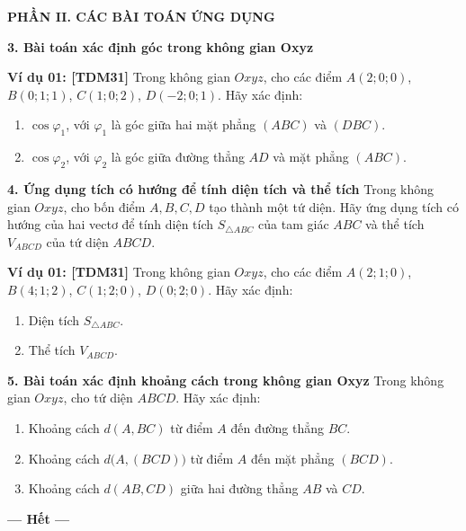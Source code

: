 \documentclass[12pt,a4paper]{article}
\newcommand{\partheading}[1]{\par\vspace{4pt}\noindent\textbf{\textcolor{sectionpurple}{#1}}\par\vspace{1pt}}
\newcommand{\example}[2][TDM22]{\par\vspace{1pt}\noindent\textbf{\textcolor{sectionpurple}{Ví dụ #2:} \textcolor{noteborder}{[#1]}}\enspace}
\newcommand{\tightitem}{\setlength{\itemsep}{0pt}\setlength{\topsep}{1pt}\setlength{\parsep}{0pt}\setlength{\partopsep}{0pt}}
\begin{document}
\partheading{PHẦN II. CÁC BÀI TOÁN ỨNG DỤNG}
\textbf{3. Bài toán xác định góc trong không gian Oxyz}
\begin{notebox}
\example[TDM31]{01} Trong không gian $Oxyz$, cho các điểm
$A(2;0;0)$, $B(0;1;1)$, $C(1;0;2)$, $D(-2;0;1)$.
Hãy xác định:
\begin{enumerate}\tightitem
 \item $\cos\varphi_1$, với $\varphi_1$ là góc giữa hai mặt phẳng $(ABC)$ và $(DBC)$.
 \item $\cos\varphi_2$, với $\varphi_2$ là góc giữa đường thẳng $AD$ và mặt phẳng $(ABC)$.
\end{enumerate}
\end{notebox}

\textbf{4. Ứng dụng tích có hướng để tính diện tích và thể tích}
Trong không gian $Oxyz$, cho bốn điểm $A,B,C,D$ tạo thành một tứ diện.
Hãy ứng dụng tích có hướng của hai vectơ để tính diện tích $S_{\triangle ABC}$
của tam giác $ABC$ và thể tích $V_{ABCD}$ của tứ diện $ABCD$.
\begin{notebox}
\example[TDM31]{01} Trong không gian $Oxyz$, cho các điểm
$A(2;1;0)$, $B(4;1;2)$, $C(1;2;0)$, $D(0;2;0)$.
Hãy xác định:
\begin{enumerate}\tightitem
 \item Diện tích $S_{\triangle ABC}$.
 \item Thể tích $V_{ABCD}$.
\end{enumerate}
\end{notebox}

\textbf{5. Bài toán xác định khoảng cách trong không gian Oxyz}
Trong không gian $Oxyz$, cho tứ diện $ABCD$. Hãy xác định:
\begin{enumerate}\tightitem
 \item Khoảng cách $d(A,BC)$ từ điểm $A$ đến đường thẳng $BC$.
 \item Khoảng cách $d\bigl(A,(BCD)\bigr)$ từ điểm $A$ đến mặt phẳng $(BCD)$.
 \item Khoảng cách $d(AB,CD)$ giữa hai đường thẳng $AB$ và $CD$.
\end{enumerate}
\begin{center}
\textbf{\textcolor{sectionpurple}{--- Hết ---}}
\end{center}
\end{document}
